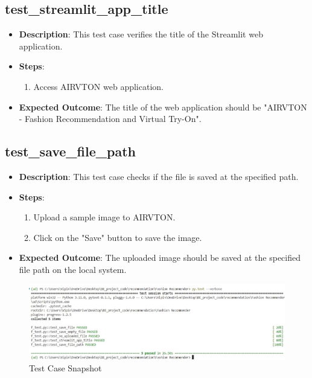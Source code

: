 \subsection{test\_streamlit\_app\_title}
\begin{itemize}
  \item \textbf{Description}: This test case verifies the title of the Streamlit web application.
  \item \textbf{Steps}:
    \begin{enumerate}
      \item Access AIRVTON web application.
    \end{enumerate}
  \item \textbf{Expected Outcome}: The title of the web application should be "AIRVTON - Fashion Recommendation and Virtual Try-On".
\end{itemize}

\subsection{test\_save\_file\_path}
\begin{itemize}
  \item \textbf{Description}: This test case checks if the file is saved at the specified path.
  \item \textbf{Steps}:
    \begin{enumerate}
      \item Upload a sample image to AIRVTON.
      \item Click on the "Save" button to save the image.
    \end{enumerate}
  \item \textbf{Expected Outcome}: The uploaded image should be saved at the specified file path on the local system.
\end{itemize}
\begin{figure}
    \includegraphics[width=\textwidth]{components/images/test_case.jpg}
    \caption{Test Case Snapshot}
    \label{fig:test-case}
\end{figure}

